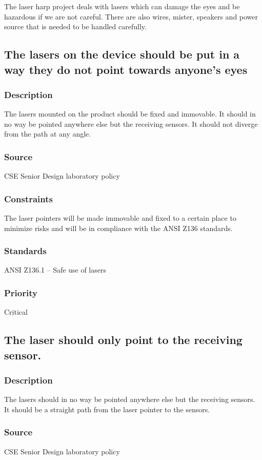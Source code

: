 The laser harp project deals with lasers which can damage the eyes and be hazardous if we are not careful. There are also wires, mister, speakers and power source that is needed to be handled carefully.

\subsection{The lasers on the device should be put in a way they do not point towards anyone’s eyes}
\subsubsection{Description}
The lasers mounted on the product should be fixed and immovable. It should in no way be pointed anywhere else but the receiving sensors. It should not diverge from the path at any angle.
\subsubsection{Source}
CSE Senior Design laboratory policy
\subsubsection{Constraints}
The laser pointers will be made immovable and fixed to a certain place to minimize risks and will be in compliance with the ANSI Z136 standards.
\subsubsection{Standards}
ANSI Z136.1 – Safe use of lasers
\subsubsection{Priority}
Critical

\subsection{The laser should only point to the receiving sensor.}
\subsubsection{Description}
The lasers should in no way be pointed anywhere else but the receiving sensors. It should be a straight path from the laser pointer to the sensors.
\subsubsection{Source}
CSE Senior Design laboratory policy

